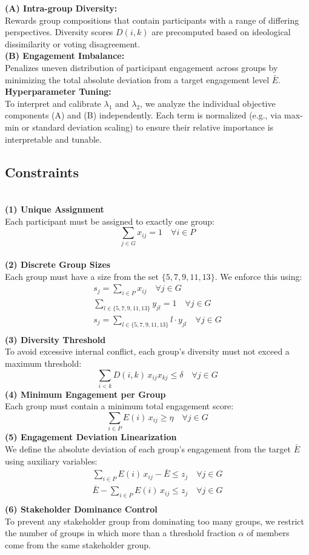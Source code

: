 \noindent
\textbf{(A) Intra-group Diversity:}\\
Rewards group compositions that contain participants with a range of differing perspectives.
Diversity scores \(D(i,k)\) are precomputed based on ideological dissimilarity or voting disagreement.
\\
\textbf{(B) Engagement Imbalance:}\\
Penalizes uneven distribution of participant engagement across groups by minimizing the total absolute deviation
from a target engagement level \(\bar{E}\).
\\
\textbf{Hyperparameter Tuning:}\\
To interpret and calibrate \(\lambda_1\) and \(\lambda_2\), we analyze the individual objective components (A)
and (B) independently.
Each term is normalized (e.g., via max-min or standard deviation scaling)
to ensure their relative importance is interpretable and tunable.

\subsection*{Constraints}
\\
\textbf{(1) Unique Assignment}\\
Each participant must be assigned to exactly one group:
\[
\sum_{j \in G} x_{ij} = 1 \quad \forall i \in P
\]
\\
\textbf{(2) Discrete Group Sizes}\\
Each group must have a size from the set \(\{5,7,9,11,13\}\).
We enforce this using:
\begin{gather*}
    s_j = \sum_{i \in P} x_{ij} \quad \forall j \in G\\
    \sum_{l \in \{5,7,9,11,13\}} y_{jl} = 1 \quad \forall j \in G\\
    s_j = \sum_{l \in \{5,7,9,11,13\}} l \cdot y_{jl} \quad \forall j \in G\\
\end{gather*}
\textbf{(3) Diversity Threshold}\\
To avoid excessive internal conflict, each group’s diversity must not exceed a maximum threshold:
\[
\sum_{i < k} D(i,k)\,x_{ij} x_{kj} \leq \delta \quad \forall j \in G
\]
\textbf{(4) Minimum Engagement per Group}\\
Each group must contain a minimum total engagement score:
\[
\sum_{i \in P} E(i)\,x_{ij} \geq \eta \quad \forall j \in G
\]
\textbf{(5) Engagement Deviation Linearization}\\
We define the absolute deviation of each group’s engagement from the target \(\bar{E}\) using auxiliary variables:
\begin{gather*}
    \sum_{i \in P} E(i)\,x_{ij} - \bar{E} \leq z_j \quad \forall j \in G\\
    \bar{E} - \sum_{i \in P} E(i)\,x_{ij} \leq z_j \quad \forall j \in G\\
\end{gather*}
\textbf{(6) Stakeholder Dominance Control}\\
To prevent any stakeholder group from dominating too many groups, we restrict the number of groups
in which more than a threshold fraction \(\alpha\) of members come from the same stakeholder group.

